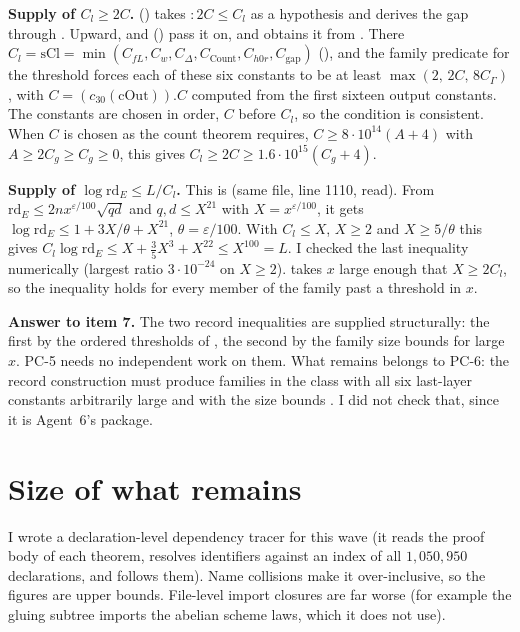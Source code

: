 \documentclass[11pt]{article}
\newcommand{\PC}[1]{\textsf{PC-#1}}
\newcommand{\rd}{\mathrm{rd}}
\begin{document}
\textbf{Supply of $C_l\ge2C$.}  () takes $\colon2C\le C_l$ as a hypothesis and derives the gap through . Upward,  and  () pass it on, and  obtains it from . There $C_l=\mathrm{sCl}=\min(C_{fL},C_w,C_\Delta,C_{\mathrm{Count}},C_{h0r},C_{\mathrm{gap}})$ (), and the family predicate  for the threshold  forces each of these six constants to be at least $\max(2,\,2C,\,8C_\Gamma)$, with $C=(c_{30}(\mathrm{cOut})).C$ computed from the first sixteen output constants. The constants are chosen in order, $C$ before $C_l$, so the condition is consistent. When $C$ is chosen as the count theorem requires, $C\ge8\cdot10^{14}(A+4)$ with $A\ge2C_g\ge C_g\ge0$, this gives $C_l\ge2C\ge1.6\cdot10^{15}(C_g+4)$.

\textbf{Supply of $\log\rd_E\le L/C_l$.} This is  (same file, line 1110, read). From $\rd_E\le2nx^{\varepsilon/100}\sqrt{qd}$ and $q,d\le X^{21}$ with $X=x^{\varepsilon/100}$, it gets $\log\rd_E\le1+3X/\theta+X^{21}$, $\theta=\varepsilon/100$. With $C_l\le X$, $X\ge2$ and $X\ge5/\theta$ this gives $C_l\log\rd_E\le X+\tfrac35X^3+X^{22}\le X^{100}=L$. I checked the last inequality numerically (largest ratio $3\cdot10^{-24}$ on $X\ge2$).  takes $x$ large enough that $X\ge2C_l$, so the inequality holds for every member of the family past a threshold in $x$.

\textbf{Answer to item 7.} The two record inequalities are supplied structurally: the first by the ordered thresholds of , the second by the family size bounds for large $x$. \PC{5} needs no independent work on them. What remains belongs to \PC{6}: the record construction must produce families in the class with all six last-layer constants arbitrarily large and with the size bounds . I did not check that, since it is Agent~6's package.

\section{Size of what remains}\label{sec:size}

I wrote a declaration-level dependency tracer for this wave (it reads the proof body of each theorem, resolves identifiers against an index of all $1{,}050{,}950$ declarations, and follows them). Name collisions make it over-inclusive, so the figures are upper bounds. File-level import closures are far worse (for example the gluing subtree imports the abelian scheme laws, which it does not use).
\end{document}
